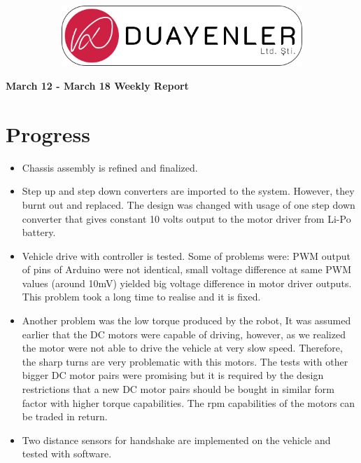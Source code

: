 \documentclass[a4paper,12pt]{article}
\begin{document}
	
\begin{figure}
	\vspace*{-.7cm}
	\centering
	\begin{figure}[H]
		\centering
		\setlength{\unitlength}{\textwidth} 
		\includegraphics[width=0.9\unitlength]{../../../documents/logos/logo3-with-stroke}
	\end{figure}
\end{figure}
\vspace*{-1.7cm}
\begin{center}
	\Large\textbf{March 12 - March 18 Weekly Report}
	\end{center}
\section{Progress}
\begin{itemize}
 
	 \item Chassis assembly is refined and finalized.
	 \item Step up and step down converters are imported to the system. However, they burnt out and replaced. The design was changed with usage of one step down converter that gives constant 10 volts output to the motor driver from Li-Po battery.
	 \item Vehicle drive with controller is tested. Some of problems were: PWM output of pins of Arduino were not identical, small voltage difference at same PWM values (around 10mV) yielded big voltage difference in motor driver outputs. This problem took a long time to realise and it is fixed.
	 \item Another problem was the low torque produced by the robot, It was assumed earlier that the DC motors were capable of driving, however, as we realized the motor were not able to drive the vehicle at very slow speed. Therefore, the sharp turns are very problematic with this motors. The tests with other bigger DC motor pairs were promising but it is required by the design restrictions that a new DC motor pairs should be bought in similar form factor with higher torque capabilities. The rpm capabilities of the motors can be traded in return.
	 \item Two distance sensors for handshake are implemented on the vehicle and tested with software.
	 
	 
    

	
	\end{itemize}
\end{document}
